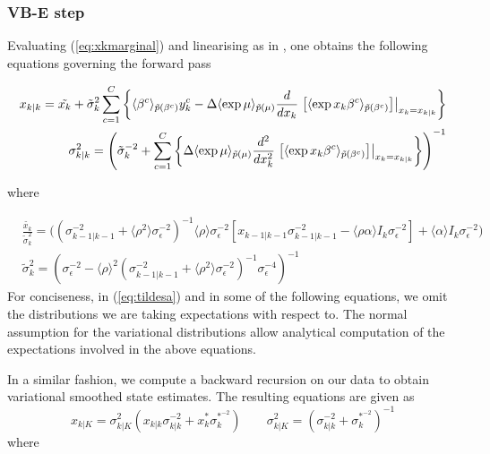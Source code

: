 \documentclass[12pt]{article}
\begin{document}
\subsubsection{VB-E step}\label{sec:VBE}

Evaluating (\ref{eq:xkmarginal}) and linearising as in \cite{Smith_2003}, one obtains the following
equations governing the forward pass

\begin{subequations} \begin{align} x_{k|k} = \tilde{x_k} +\tilde{\sigma}^2_k \sum_{c=1}^C
	\left\{\langle\beta^c\rangle_{\pt(\beta^c)}y^c_k - \Delta \langle \exp{\mu}
	\rangle_{\pt(\mu)} \frac{d}{dx_{k}}\left.\left[\langle \exp{x_k\beta^c}
	\rangle_{\pt(\beta^c)}\right]\right|_{x_k = x_{k | k}}  \right\} \label{eq:NL1} \\
	\sigma^2_{k|k} = \left(\tilde{\sigma}^{-2}_k + \sum_{c=1}^C \left\{\Delta  \langle \exp{\mu}
	\rangle_{\pt(\mu)} \frac{d^2}{dx_k^2}\left.\left[\langle \exp{x_k\beta^c}
	\rangle_{\pt(\beta^c)}\right]\right|_{x_k = x_{k | k}}\right\}\right)^{-1} \end{align}
\end{subequations}

\noindent where


\begin{equation}\begin{split}\label{eq:tildesa} &\frac{\tilde{x_k}}{\tilde{\sigma}^2_k}=
	\bigg((\sigma^{-2}_{k-1|k-1} + \langle \rho^2 \rangle \sigma^{-2}_\epsilon )^{-1} \langle
	\rho \rangle\sigma^{-2}_\epsilon\left[x_{k-1|k-1}\sigma^{-2}_{k-1|k-1} - \langle \rho\alpha
	\rangle I_k\sigma^{-2}_\epsilon \right] + \langle \alpha \rangle I_k\sigma^{-2}_\epsilon
	\bigg)  \\ &\tilde{\sigma}^2_k = (\sigma^{-2}_\epsilon - \langle \rho \rangle^2
	(\sigma^{-2}_{k-1|k-1} + \langle \rho^2 \rangle \sigma^{-2}_\epsilon
	)^{-1}\sigma^{-4}_\epsilon  )^{-1} \end{split}\end{equation} For conciseness, in
	(\ref{eq:tildesa})  and in some of the following equations, we omit the distributions we are
	taking expectations with respect to. The normal assumption for the variational distributions
	allow analytical computation of the expectations involved in the above equations.

In a similar fashion, we compute a backward recursion on our data to obtain variational smoothed
state estimates. The resulting equations are given as \begin{equation} x_{k|K} =
	\sigma^2_{k|K}(x_{k|k}\sigma^{-2}_{k|k} + x_{k}^*\sigma^{*^{-2}}_{k}) \qquad \sigma^2_{k|K}
	= (\sigma^{-2}_{k|k} + \sigma^{*^{-2}}_{k})^{-1} \end{equation} 	\noindent where
\end{document}
